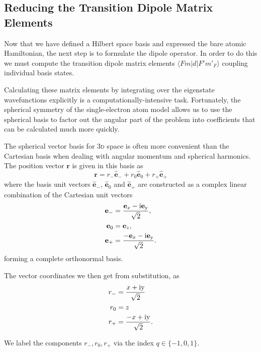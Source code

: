   \subsection{Reducing the Transition Dipole Matrix Elements}

    Now that we have defined a Hilbert space basis and expressed the bare atomic
    Hamiltonian, the next step is to formulate the dipole operator. In order to
    do this we must compute the transition dipole matrix elements
    $\langle F m | d | F' m'_F \rangle$ coupling individual
    basis states.

    Calculating these matrix elements by integrating over the eigenstate
    wavefunctions explicitly is a computationally-intensive task. Fortunately,
    the spherical symmetry of the single-electron atom model allows us to use
    the spherical basis to factor out the angular part of the problem into
    coefficients that can be calculated much more quickly.

    The spherical vector basis for \textsc{3d} space is often more convenient
    than the Cartesian basis when dealing with angular momentum and spherical
    harmonics. The position vector $\mathbf{r}$ is given in this basis as
    \begin{equation}
      \mathbf{r} = r_- \hat{\mathbf{e}}_- + r_0 \hat{\mathbf{e}}_0 + 
        r_+ \hat{\mathbf{e}}_+
    \end{equation}
    where the basis unit vectors $\hat{\mathbf{e}}_-$, $\hat{\mathbf{e}}_0$ and
    $\hat{\mathbf{e}}_+$ are constructed as a complex linear combination of the
    Cartesian unit vectors
    \begin{align}
      \mathbf{e}_- &= \frac{\mathbf{e}_x - \rm{i} \mathbf{e}_y }{\sqrt{2}}, \\
      \mathbf{e}_0 &= \mathbf{e}_z, \\
      \mathbf{e}_+ &= \frac{-\mathbf{e}_x - \rm{i} \mathbf{e}_y }{\sqrt{2}}.
    \end{align}
    forming a complete orthonormal basis.

    The vector coordinates we then get from substitution, as
    \begin{align}
      r_- &= \frac{x + \rm{i} y }{\sqrt{2}} \\
      r_0 &= z \\
      r_+ &= \frac{-x + \rm{i} y }{\sqrt{2}}.
    \end{align}

    We label the components $r_-, r_0, r_+$ via the index $q \in \{ -1, 0, 1\}$.

